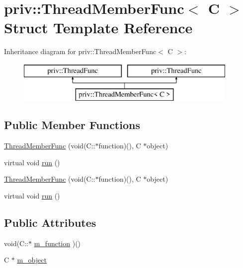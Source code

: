 \hypertarget{structpriv_1_1_thread_member_func}{\section{priv\-:\-:Thread\-Member\-Func$<$ C $>$ Struct Template Reference}
\label{structpriv_1_1_thread_member_func}
}
Inheritance diagram for priv\-:\-:Thread\-Member\-Func$<$ C $>$\-:\begin{figure}[H]
\begin{center}
\leavevmode
\includegraphics[height=2.000000cm]{structpriv_1_1_thread_member_func}
\end{center}
\end{figure}
\subsection*{Public Member Functions}
\begin{DoxyCompactItemize}
\item 
\hyperlink{structpriv_1_1_thread_member_func_ae44619c4cf6d886da6f32a1de37d652e}{Thread\-Member\-Func} (void(C\-::$\ast$function)(), C $\ast$object)
\item 
virtual void \hyperlink{structpriv_1_1_thread_member_func_abbd440e93edf2747cf9cdde579bc5de0}{run} ()
\item 
\hyperlink{structpriv_1_1_thread_member_func_ae44619c4cf6d886da6f32a1de37d652e}{Thread\-Member\-Func} (void(C\-::$\ast$function)(), C $\ast$object)
\item 
virtual void \hyperlink{structpriv_1_1_thread_member_func_abbd440e93edf2747cf9cdde579bc5de0}{run} ()
\end{DoxyCompactItemize}
\subsection*{Public Attributes}
\begin{DoxyCompactItemize}
\item 
void(C\-::$\ast$ \hyperlink{structpriv_1_1_thread_member_func_a237f80d81258c6553fd18e86880ab6c4}{m\-\_\-function} )()
\item 
C $\ast$ \hyperlink{structpriv_1_1_thread_member_func_acd19c00f65795319eeb10830be7c4569}{m\-\_\-object}
\end{DoxyCompactItemize}


